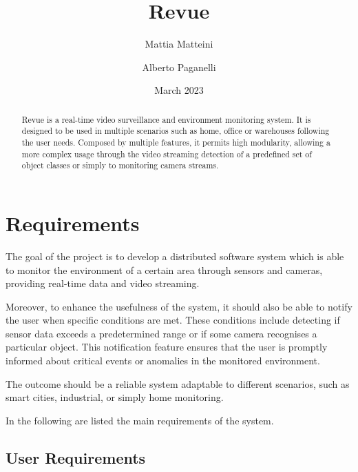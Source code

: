 \documentclass{scrartcl}
\title{
    Revue
}
\author{
    Mattia Matteini \\ \emailaddr{mattia.matteini@studio.unibo.it}
    \and
    Alberto Paganelli \\ \emailaddr{alberto.paganelli3@studio.unibo.it}
}
\date{March 2023}
\begin{document}
    \maketitle

    \begin{abstract}
        Revue is a real-time video surveillance and environment monitoring system.
        It is designed to be used in multiple scenarios such as home, office or warehouses following the user needs.
%
        Composed by multiple features, it permits high modularity, allowing a more complex usage through the video streaming detection of a predefined set of object classes or simply to monitoring camera streams.
    \end{abstract}


    \section{Requirements}

    The goal of the project is to develop a distributed software system which is able to monitor the environment
    of a certain area through sensors and cameras, providing real-time data and video streaming.

    Moreover, to enhance the usefulness of the system, it should also be able to notify the user when specific conditions are met.
    These conditions include detecting if sensor data exceeds a predetermined range or if some camera recognises a particular object.
    This notification feature ensures that the user is promptly informed about critical
    events or anomalies in the monitored environment.

    The outcome should be a reliable system adaptable to different scenarios, such as smart cities, industrial, or
    simply home monitoring.

    In the following are listed the main requirements of the system.

    \subsection{User Requirements}\label{subsec:user-requirements}
\end{document}
